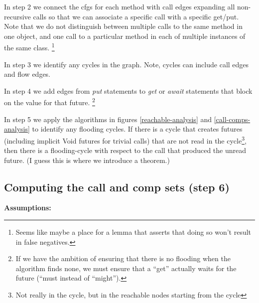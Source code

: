 \documentclass[12pt]{article}%
\begin{document}
In step 2 we connect the cfgs for each method with call edges expanding all non-recursive calls so that we can
associate a specific call with a specific get/put. Note that we do not distinguish between multiple calls to the same method in one
object, and one call to a particular method in each of multiple instances of the same class. 
\footnote{Seems like maybe a place for a lemma that asserts that doing so won't result in false negatives.}

In step 3 we identify any cycles in the graph. Note, cycles can include call edges and flow edges.

In step 4 we add edges from \emph{put} statements to \emph{get} or \emph{await} statements that block on the value for that future.
\footnote{If we have the ambition of ensuring that 
there is no flooding when the algorithm finds none,
we must ensure that a ``get'' actually waits for the future
(``must instead of ``might'').}

In step 5 we apply the algorithms in figures \ref{reachable-analysis} and  \ref{call-comps-analysis} to identify any flooding cycles.
If there is a cycle that creates futures (including implicit Void futures for trivial calls) that are not read
in the cycle\footnote{Not really in the cycle, but in the reachable nodes starting from the cycle}, 
then there is a flooding-cycle with respect to the call that produced the unread future. 
(I guess this is where we introduce a theorem.)

\subsection{Computing the call and comp sets (step 6)}

\textbf{Assumptions:}
\end{document}
